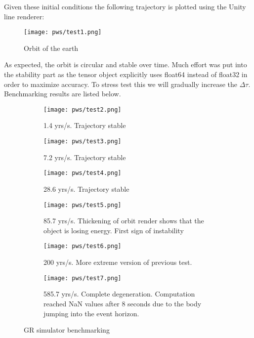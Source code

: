 \documentclass{article}
\begin{document}
Given these initial conditions the following trajectory is plotted using the Unity line renderer:

  \begin{figure}[h!]
    \centering
    \texttt{[image: pws/test1.png]}
    \caption{Orbit of the earth}
    \label{fig:test1}
  \end{figure}

As expected, the orbit is circular and stable over time. Much effort was put into the stability part as the tensor object explicitly uses float64 instead of float32 in order to maximize accuracy. To stress test this we will gradually increase the $\Delta \tau$. Benchmarking results are listed below.

\newpage
\begin{figure}[t!]
  \centering
  \begin{subfigure}[h!]{0.4\linewidth}
    \texttt{[image: pws/test2.png]}
    \caption{1.4 yrs/s. Trajectory stable}
  \end{subfigure}  
  \begin{subfigure}[h!]{0.4\linewidth}
    \texttt{[image: pws/test3.png]}
    \caption{7.2 yrs/s. Trajectory stable}
  \end{subfigure}  
  \begin{subfigure}[h!]{0.4\linewidth}
    \texttt{[image: pws/test4.png]}
    \caption{28.6 yrs/s. Trajectory stable}
  \end{subfigure}  
  \begin{subfigure}[h!]{0.4\linewidth}
    \texttt{[image: pws/test5.png]}
    \caption{85.7 yrs/s. Thickening of orbit render shows that the object is losing energy. First sign of instability}
  \end{subfigure}  
  \begin{subfigure}[h!]{0.4\linewidth}
    \texttt{[image: pws/test6.png]}
    \caption{200 yrs/s. More extreme version of previous test.}
  \end{subfigure}  
  \begin{subfigure}[h!]{0.4\linewidth}
    \texttt{[image: pws/test7.png]}
    \caption{585.7 yrs/s. Complete degeneration. Computation reached NaN values after 8 seconds due to the body jumping into the event horizon.}
  \end{subfigure}  
  \caption{GR simulator benchmarking}
  \label{fig:test2}
\end{figure}
\end{document}
